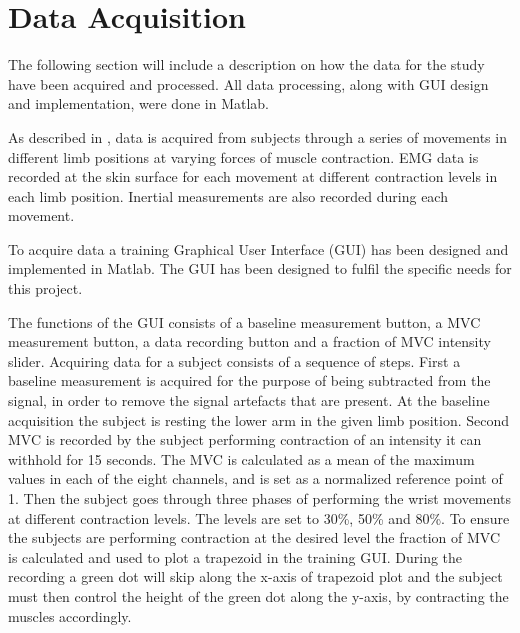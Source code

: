 \section{Data Acquisition}

The following section will include a description on how the data for the study have been acquired and processed. All data processing, along with GUI design and implementation, were done in Matlab.

As described in , data is acquired from subjects through a series of movements in different limb positions at varying forces of muscle contraction. EMG data is recorded at the skin surface for each movement at different contraction levels in each limb position. Inertial measurements are also recorded during each movement. 

To acquire data a training Graphical User Interface (GUI) has been designed and implemented in Matlab. The GUI has been designed to fulfil the specific needs for this project. 

The functions of the GUI consists of a baseline measurement button, a MVC measurement button, a data recording button and a fraction of MVC intensity slider. Acquiring data for a subject consists of a sequence of steps. First a baseline measurement is acquired for the purpose of being subtracted from the signal, in order to remove the signal artefacts that are present. At the baseline acquisition the subject is resting the lower arm in the given limb position. 
Second MVC is recorded by the subject performing contraction of an intensity it can withhold for 15 seconds. The MVC is calculated as a mean of the maximum values in each of the eight channels, and is set as a normalized reference point of 1.
Then the subject goes through three phases of performing the wrist movements at different contraction levels. The levels are set to 30\%, 50\% and 80\%. To ensure the subjects are performing contraction at the desired level the fraction of MVC is calculated and used to plot a trapezoid in the training GUI. During the recording a green dot will skip along the x-axis of trapezoid plot and the subject must then control the height of the green dot along the y-axis, by contracting the muscles accordingly. %

